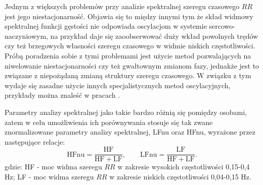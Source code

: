 Jednym z większych problemów przy analizie spektralnej szeregu czasowego $RR$ jest jego
niestacjonarność. Objawia się to między innymi tym że skład widmowy spektralnej funkcji
gęstości nie odpowiada oscylacjom w systemie sercowo-naczyniowym, na przykład daje się
zaoobserwować duży wkład powolnych trędów czy też brzegowych własności szeregu czasowego
w widmie niskich częstotliwości. Próbą poradzenia sobie z tymi problemami jest użycie metod
pozwalających na niwelowanie niestacjonarności czy też gwałtownym zmianom fazy, jednakże
jest to związane z niepożądaną zmianą struktury szeregu czasowego. W związku z tym wydaje
się zasadne użycie innych specjalistycznych metod oscylacyjnych, przykłady można znaleść
w pracach \cite{task2, hrv_origins, prsa_k}.     
 
Parametry analizy spektralnej jako takie bardzo różnią się pomiędzy osobami, zatem w celu
umożliwienia ich porównywania stosuje się tak zwane znormalizowane parametry analizy
spektralnej, LFnu oraz HFnu, wyrażone przez następujące relacje:
\begin{equation}
\mathrm{HFnu=\frac{HF}{HF+LF}},\qquad \mathrm{LFnu=\frac{LF}{HF+LF}}. \label{HFLFnu}
\end{equation}
gdzie: HF - moc widma szeregu $RR$ w zakresie wysokich częstotliwości 0,15-0,4 Hz;
LF - moc widma szeregu $RR$ w zakresie niskich częstotliwości 0,04-0,15 Hz.



